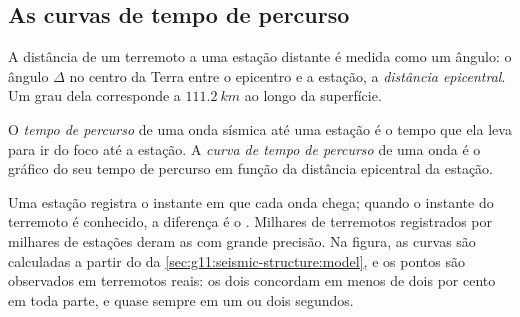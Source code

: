 \subsection{As curvas de tempo de percurso}

A distância de um terremoto a uma estação distante é medida como um ângulo:
o ângulo $\Delta$ no centro da Terra entre o epicentro e a estação, a
\emph{distância epicentral}.
Um grau dela corresponde a $\qty{111.2}{km}$ ao longo da superfície.

\begin{definition}\label{def:g11:seismic-structure:travel-time}
O \emph{tempo de percurso} de uma onda sísmica até
uma estação é o tempo que ela leva para ir do foco até a estação. A
\emph{curva de tempo de percurso} de uma
onda é o gráfico do seu tempo de percurso em função da distância epicentral
da estação.
\end{definition}

Uma estação registra o instante em que cada onda chega; quando o instante do
terremoto é conhecido, a diferença é o . Milhares de
terremotos registrados por milhares de estações deram as  com grande precisão. Na figura, as curvas são calculadas a partir
do  da \cref{sec:g11:seismic-structure:model},
e os pontos são  observados em terremotos reais: os dois
concordam em menos de dois por cento em toda parte, e quase sempre em um ou
dois segundos.


